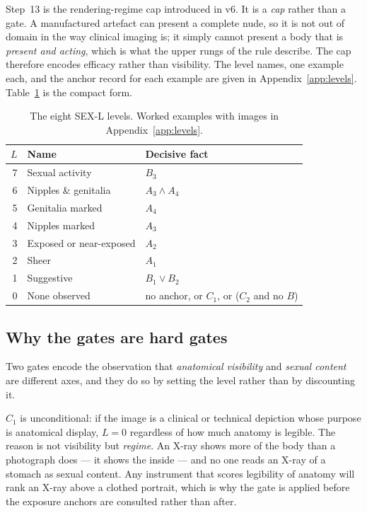 \documentclass[11pt]{article}
\newcommand{\sexl}{\textsc{SEX-L}}
\begin{document}
Step~13 is the rendering-regime cap introduced in v6. It is a \emph{cap} rather than a gate. A manufactured artefact can present a complete nude, so it is not out of domain in the way clinical imaging is; it simply cannot present a body that is \emph{present and acting}, which is what the upper rungs of the rule describe. The cap therefore encodes efficacy rather than visibility.
The level names, one example each, and the anchor record for each example are given in Appendix~\ref{app:levels}. Table~\ref{tab:levels} is the compact form.

\begin{table}[t]
\centering\small
\begin{tabularx}{\columnwidth}{@{}rlX@{}}
\toprule
$L$ & Name & Decisive fact \\
\midrule
7 & Sexual activity & $B_3$ \\
6 & Nipples \& genitalia & $A_3 \wedge A_4$ \\
5 & Genitalia marked & $A_4$ \\
4 & Nipples marked & $A_3$ \\
3 & Exposed or near-exposed & $A_2$ \\
2 & Sheer & $A_1$ \\
1 & Suggestive & $B_1 \vee B_2$ \\
0 & None observed & no anchor, or $C_1$, or ($C_2$ and no $B$) \\
\bottomrule
\end{tabularx}
\caption{The eight \sexl{} levels. Worked examples with images in Appendix~\ref{app:levels}.}
\label{tab:levels}
\end{table}

\subsection{Why the gates are hard gates}
Two gates encode the observation that \emph{anatomical visibility} and \emph{sexual content} are different axes, and they do so by setting the level rather than by discounting it.

$C_1$ is unconditional: if the image is a clinical or technical depiction whose purpose is anatomical display, $L=0$ regardless of how much anatomy is legible. The reason is not visibility but \emph{regime}. An X-ray shows more of the body than a photograph does --- it shows the inside --- and no one reads an X-ray of a stomach as sexual content. Any instrument that scores legibility of anatomy will rank an X-ray above a clothed portrait, which is why the gate is applied before the exposure anchors are consulted rather than after.
\end{document}
